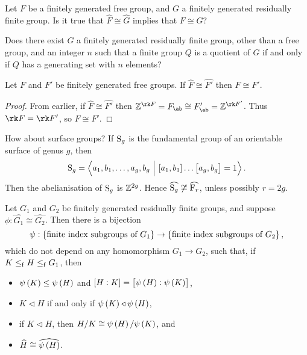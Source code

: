 \begin{question}
Let $ F $ be a finitely generated free group, and $ G $ a finitely generated residually finite group. Is it true that $ \widehat{F} \cong \widehat{G} $ implies that $ F \cong G $?
\end{question}

\begin{question}
Does there exist $ G $ a finitely generated residually finite group, other than a free group, and an integer $ n $ such that a finite group $ Q $ is a quotient of $ G $ if and only if $ Q $ has a generating set with $ n $ elements?
\end{question}

\pagebreak

\begin{proposition}
Let $ F $ and $ F' $ be finitely generated free groups. If $ \widehat{F} \cong \widehat{F'} $ then $ F \cong F' $.
\end{proposition}

\begin{proof}
From earlier, if $ \widehat{F} \cong \widehat{F'} $ then $ \ZZ^{\rk F} = F_{\ab} \cong F_{\ab}' = \ZZ^{\rk F'} $. Thus $ \rk F = \rk F' $, so $ F \cong F' $.
\end{proof}

How about surface groups? If $ \S_g $ is the fundamental group of an orientable surface of genus $ g $, then
$$ \S_g = \abr{a_1, b_1, \dots, a_g, b_g \st \sbr{a_1, b_1} \dots \sbr{a_g, b_g} = 1}. $$
Then the abelianisation of $ \S_g $ is $ \ZZ^{2g} $. Hence $ \widehat{\S_g} \not\cong \widehat{\F_r} $, unless possibly $ r = 2g $.

\begin{theorem}
Let $ G_1 $ and $ G_2 $ be finitely generated residually finite groups, and suppose $ \phi : \widehat{G_1} \cong \widehat{G_2} $. Then there is a bijection
$$ \psi : \cbr{\text{finite index subgroups of} \ G_1} \to \cbr{\text{finite index subgroups of} \ G_2}, $$
which do not depend on any homomorphism $ G_1 \to G_2 $, such that, if $ K \le_\f H \le_\f G_1 $, then
\begin{itemize}
\item $ \psi\br{K} \le \psi\br{H} $ and $ \sbr{H : K} = \sbr{\psi\br{H} : \psi\br{K}} $,
\item $ K \triangleleft H $ if and only if $ \psi\br{K} \triangleleft \psi\br{H} $,
\item if $ K \triangleleft H $, then $ H / K \cong \psi\br{H} / \psi\br{K} $, and
\item $ \widehat{H} \cong \widehat{\psi\br{H}} $.
\end{itemize}
\end{theorem}

